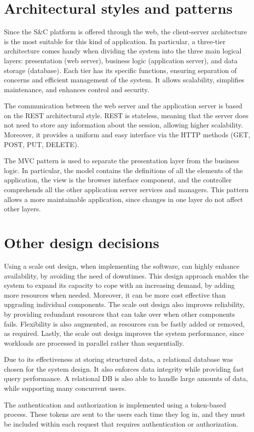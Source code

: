 \section{Architectural styles and patterns}

Since the S\&C platform is offered through the web, the client-server architecture is the most suitable for this kind of application.
In particular, a three-tier architecture comes handy when dividing the system into the three main logical layers: presentation (web server), business logic (application server), and data storage (database).
Each tier has its specific functions, ensuring separation of concerns and efficient management of the system.
It allows scalability, simplifies maintenance, and enhances control and security.

The communication between the web server and the application server is based on the REST architectural style.
REST is stateless, meaning that the server does not need to store any information about the session, allowing higher scalability.
Moreover, it provides a uniform and easy interface via the HTTP methods (GET, POST, PUT, DELETE).

The MVC pattern is used to separate the presentation layer from the business logic.
In particular, the model contains the definitions of all the elements of the application, the view is the browser interface component, and the controller comprehends all the other application server services and managers.
This pattern allows a more maintainable application, since changes in one layer do not affect other layers.

\section{Other design decisions}

Using a scale out design, when implementing the software, can highly enhance availability, by avoiding the need of downtimes.
This design approach enables the system to expand its capacity to cope with an increasing demand, by adding more resources when needed.
Moreover, it can be more cost effective than upgrading individual components.
The scale out design also improves reliability, by providing redundant resources that can take over when other components fails.
Flexibility is also augmented, as resources can be fastly added or removed, as required.
Lastly, the scale out design improves the system performance, since workloads are processed in parallel rather than sequentially.

Due to its effectiveness at storing structured data, a relational database was chosen for the system design.
It also enforces data integrity while providing fast query performance.
A relational DB is also able to handle large amounts of data, while supporting many concurrent users.

The authentication and authorization is implemented using a token-based process.
These tokens are sent to the users each time they log in, and they must be included within each request that requires authentication or authorization.

